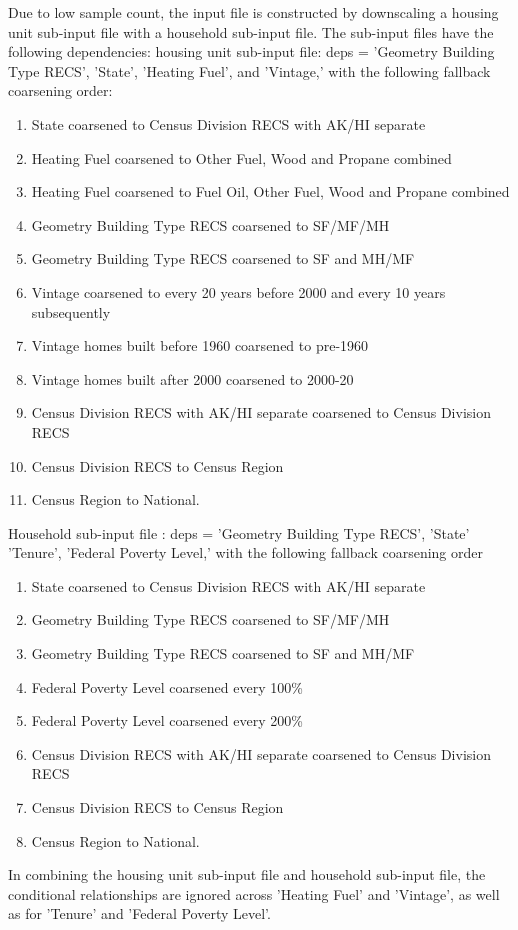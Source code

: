 Due to low sample count, the input file is constructed by downscaling a housing unit sub-input file with a household sub-input file. The sub-input files have the following dependencies: 
housing unit sub-input file: deps = 'Geometry Building Type RECS', 'State', 'Heating Fuel', and 'Vintage,' with the following fallback coarsening order:
\begin{enumerate}
    \item  State coarsened to Census Division RECS with AK/HI separate 
    \item Heating Fuel coarsened to Other Fuel, Wood and Propane combined 
    \item Heating Fuel coarsened to Fuel Oil, Other Fuel, Wood and Propane combined 
    \item Geometry Building Type RECS coarsened to SF/MF/MH 
    \item  Geometry Building Type RECS coarsened to SF and MH/MF 
    \item  Vintage coarsened to every 20 years before 2000 and every 10 years subsequently 
    \item Vintage homes built before 1960 coarsened to pre-1960 
    \item Vintage homes built after 2000 coarsened to 2000-20 
    \item Census Division RECS with AK/HI separate coarsened to Census Division RECS 
    \item Census Division RECS to Census Region 
    \item Census Region to National. 
\end{enumerate}
Household sub-input file : deps = 'Geometry Building Type RECS', 'State' 'Tenure', 'Federal Poverty Level,' with the following fallback coarsening order
\begin{enumerate}
\item   State coarsened to Census Division RECS with AK/HI separate 
\item  Geometry Building Type RECS coarsened to SF/MF/MH 
\item  Geometry Building Type RECS coarsened to SF and MH/MF 
\item  Federal Poverty Level coarsened every 100\% 
\item Federal Poverty Level coarsened every 200\%
\item Census Division RECS with AK/HI separate coarsened to Census Division RECS 
\item Census Division RECS to Census Region 
\item Census Region to National. 
\end{enumerate}
In combining the housing unit sub-input file and household sub-input file, the conditional relationships are ignored across 'Heating Fuel' and 'Vintage', as well as for 'Tenure' and 'Federal Poverty Level'.

